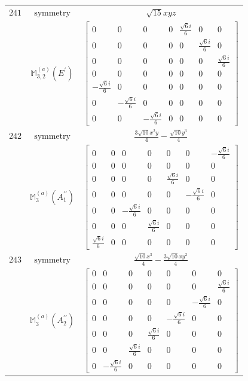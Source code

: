 \documentclass[fleqn,8pt,landscape]{jsarticle}
\begin{document}
\begin{longtable}{ccc}
$ 241 $ & $ \text{symmetry} $ & $ \sqrt{15} x y z $ \\
$  $ & $ \mathbb{M}_{3,2}^{(a)}(E^{\prime}) $ & $ \begin{bmatrix} 0 & 0 & 0 & 0 & \frac{\sqrt{6} i}{6} & 0 & 0 \\ 0 & 0 & 0 & 0 & 0 & \frac{\sqrt{6} i}{6} & 0 \\ 0 & 0 & 0 & 0 & 0 & 0 & \frac{\sqrt{6} i}{6} \\ 0 & 0 & 0 & 0 & 0 & 0 & 0 \\ - \frac{\sqrt{6} i}{6} & 0 & 0 & 0 & 0 & 0 & 0 \\ 0 & - \frac{\sqrt{6} i}{6} & 0 & 0 & 0 & 0 & 0 \\ 0 & 0 & - \frac{\sqrt{6} i}{6} & 0 & 0 & 0 & 0 \end{bmatrix} $ \\ \hline
$ 242 $ & $ \text{symmetry} $ & $ \frac{3 \sqrt{10} x^{2} y}{4} - \frac{\sqrt{10} y^{3}}{4} $ \\
$  $ & $ \mathbb{M}_{3}^{(a)}(A_{1}^{\prime\prime}) $ & $ \begin{bmatrix} 0 & 0 & 0 & 0 & 0 & 0 & - \frac{\sqrt{6} i}{6} \\ 0 & 0 & 0 & 0 & 0 & 0 & 0 \\ 0 & 0 & 0 & 0 & \frac{\sqrt{6} i}{6} & 0 & 0 \\ 0 & 0 & 0 & 0 & 0 & - \frac{\sqrt{6} i}{6} & 0 \\ 0 & 0 & - \frac{\sqrt{6} i}{6} & 0 & 0 & 0 & 0 \\ 0 & 0 & 0 & \frac{\sqrt{6} i}{6} & 0 & 0 & 0 \\ \frac{\sqrt{6} i}{6} & 0 & 0 & 0 & 0 & 0 & 0 \end{bmatrix} $ \\ \hline
$ 243 $ & $ \text{symmetry} $ & $ \frac{\sqrt{10} x^{3}}{4} - \frac{3 \sqrt{10} x y^{2}}{4} $ \\
$  $ & $ \mathbb{M}_{3}^{(a)}(A_{2}^{\prime\prime}) $ & $ \begin{bmatrix} 0 & 0 & 0 & 0 & 0 & 0 & 0 \\ 0 & 0 & 0 & 0 & 0 & 0 & \frac{\sqrt{6} i}{6} \\ 0 & 0 & 0 & 0 & 0 & - \frac{\sqrt{6} i}{6} & 0 \\ 0 & 0 & 0 & 0 & - \frac{\sqrt{6} i}{6} & 0 & 0 \\ 0 & 0 & 0 & \frac{\sqrt{6} i}{6} & 0 & 0 & 0 \\ 0 & 0 & \frac{\sqrt{6} i}{6} & 0 & 0 & 0 & 0 \\ 0 & - \frac{\sqrt{6} i}{6} & 0 & 0 & 0 & 0 & 0 \end{bmatrix} $ \\ \hline

\end{longtable}
\end{document}
